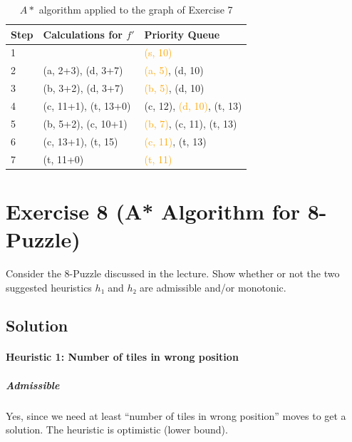 \documentclass[a4paper, 12pt]{report}
\newcommand{\highlight}[1]{\textcolor{orange}{#1}}
\begin{document}
\begin{table}[htbp]
    \caption{$A*$ algorithm applied to the graph of Exercise 7}
    \begin{center}
        \begin{tabular}{lll}
            Step & Calculations for $f'$    & Priority Queue\\
            \hline
            1    &                          & \highlight{(s, 10)}\\
            2    & (a, 2+3), (d, 3+7)       & \highlight{(a, 5)}, (d, 10)\\
            3    & (b, 3+2), (d, 3+7)       & \highlight{(b, 5)}, (d, 10)\\
            4    & (c, 11+1), (t, 13+0)     & (c, 12), \highlight{(d, 10)},
                                              (t, 13)\\
            5    & (b, 5+2), (c, 10+1)      & \highlight{(b, 7)}, (c, 11),
                                              (t, 13)\\
            6    & (c, 13+1), (t, 15)       & \highlight{(c, 11)}, (t, 13)\\
            7    & (t, 11+0)                & \highlight{(t, 11)}\\
        \end{tabular}
    \end{center}
    \label{table:A_Star}
\end{table}

\section{Exercise 8 (A* Algorithm for 8-Puzzle)}

Consider the 8-Puzzle discussed in the lecture. Show whether or not the two
suggested heuristics $h₁$ and $h₂$ are admissible and/or monotonic.

\subsection{Solution}

\paragraph{Heuristic 1: Number of tiles in wrong position}

\subparagraph{Admissible}

Yes, since we need at least “number of tiles in wrong position” moves to get a
solution. The heuristic is optimistic (lower bound).
\end{document}
